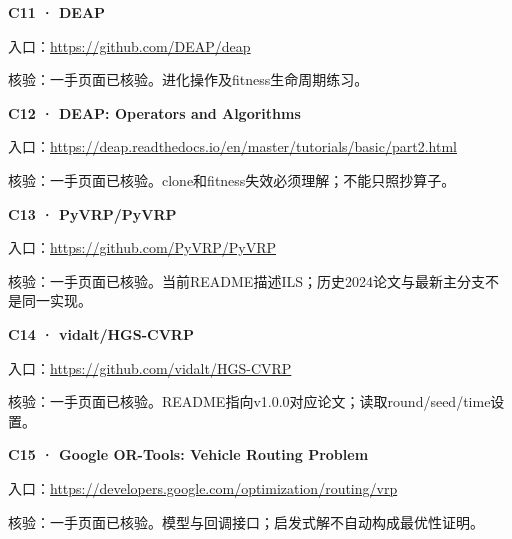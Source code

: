 \par\noindent\begin{minipage}{\linewidth}
\textbf{C11 · DEAP}

入口：\url{https://github.com/DEAP/deap}

核验：一手页面已核验。进化操作及fitness生命周期练习。
\end{minipage}\par\vspace{6pt}

\par\noindent\begin{minipage}{\linewidth}
\textbf{C12 · DEAP: Operators and Algorithms}

入口：\url{https://deap.readthedocs.io/en/master/tutorials/basic/part2.html}

核验：一手页面已核验。clone和fitness失效必须理解；不能只照抄算子。
\end{minipage}\par\vspace{6pt}

\par\noindent\begin{minipage}{\linewidth}
\textbf{C13 · PyVRP/PyVRP}

入口：\url{https://github.com/PyVRP/PyVRP}

核验：一手页面已核验。当前README描述ILS；历史2024论文与最新主分支不是同一实现。
\end{minipage}\par\vspace{6pt}

\par\noindent\begin{minipage}{\linewidth}
\textbf{C14 · vidalt/HGS-CVRP}

入口：\url{https://github.com/vidalt/HGS-CVRP}

核验：一手页面已核验。README指向v1.0.0对应论文；读取round/seed/time设置。
\end{minipage}\par\vspace{6pt}

\par\noindent\begin{minipage}{\linewidth}
\textbf{C15 · Google OR-Tools: Vehicle Routing Problem}

入口：\url{https://developers.google.com/optimization/routing/vrp}

核验：一手页面已核验。模型与回调接口；启发式解不自动构成最优性证明。
\end{minipage}\par\vspace{6pt}

